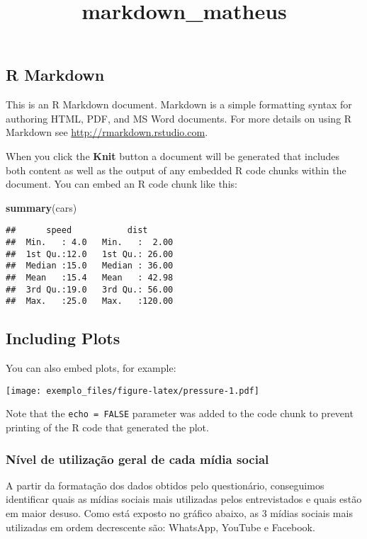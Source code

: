 \documentclass[]{article}
\title{markdown\_matheus}
\author{}
\date{}
\newenvironment{Shaded}{\begin{snugshade}}{\end{snugshade}}
\newcommand{\KeywordTok}[1]{\textcolor[rgb]{0.13,0.29,0.53}{\textbf{#1}}}
\newcommand{\NormalTok}[1]{#1}
\begin{document}
\maketitle

\subsection{R Markdown}\label{r-markdown}

This is an R Markdown document. Markdown is a simple formatting syntax
for authoring HTML, PDF, and MS Word documents. For more details on
using R Markdown see \url{http://rmarkdown.rstudio.com}.

When you click the \textbf{Knit} button a document will be generated
that includes both content as well as the output of any embedded R code
chunks within the document. You can embed an R code chunk like this:

\begin{Shaded}
\begin{Highlighting}[]
\KeywordTok{summary}\NormalTok{(cars)}
\end{Highlighting}
\end{Shaded}

\begin{verbatim}
##      speed           dist       
##  Min.   : 4.0   Min.   :  2.00  
##  1st Qu.:12.0   1st Qu.: 26.00  
##  Median :15.0   Median : 36.00  
##  Mean   :15.4   Mean   : 42.98  
##  3rd Qu.:19.0   3rd Qu.: 56.00  
##  Max.   :25.0   Max.   :120.00
\end{verbatim}

\subsection{Including Plots}\label{including-plots}

You can also embed plots, for example:

\texttt{[image: exemplo\_files/figure-latex/pressure-1.pdf]}

Note that the \texttt{echo\ =\ FALSE} parameter was added to the code
chunk to prevent printing of the R code that generated the plot.

\subsubsection{Nível de utilização geral de cada mídia
social}\label{nivel-de-utilizacao-geral-de-cada-midia-social}

A partir da formatação dos dados obtidos pelo questionário, conseguimos
identificar quais as mídias sociais mais utilizadas pelos entrevistados
e quais estão em maior desuso. Como está exposto no gráfico abaixo, as 3
mídias sociais mais utilizadas em ordem decrescente são: WhatsApp,
YouTube e Facebook.
\end{document}
